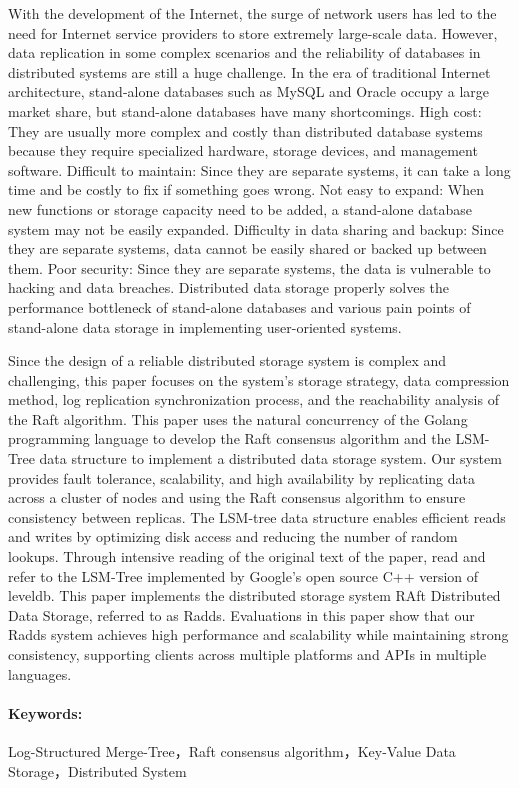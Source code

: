 With the development of the Internet, the surge of network users has led to the need for Internet service providers to store extremely large-scale data. However, data replication in some complex scenarios and the reliability of databases in distributed systems are still a huge challenge.
In the era of traditional Internet architecture, stand-alone databases such as MySQL and Oracle occupy a large market share, but stand-alone databases have many shortcomings.
High cost: They are usually more complex and costly than distributed database systems because they require specialized hardware, storage devices, and management software.
Difficult to maintain: Since they are separate systems, it can take a long time and be costly to fix if something goes wrong.
Not easy to expand: When new functions or storage capacity need to be added, a stand-alone database system may not be easily expanded.
Difficulty in data sharing and backup: Since they are separate systems, data cannot be easily shared or backed up between them.
Poor security: Since they are separate systems, the data is vulnerable to hacking and data breaches.
Distributed data storage properly solves the performance bottleneck of stand-alone databases and various pain points of stand-alone data storage in implementing user-oriented systems.


Since the design of a reliable distributed storage system is complex and challenging, this paper focuses on the system's storage strategy, data compression method, log replication synchronization process, and the reachability analysis of the Raft algorithm.
This paper uses the natural concurrency of the Golang programming language to develop the Raft consensus algorithm and the LSM-Tree data structure to implement a distributed data storage system.
Our system provides fault tolerance, scalability, and high availability by replicating data across a cluster of nodes and using the Raft consensus algorithm to ensure consistency between replicas.
The LSM-tree data structure enables efficient reads and writes by optimizing disk access and reducing the number of random lookups.
Through intensive reading of the original text of the paper, read and refer to the LSM-Tree implemented by Google's open source C++ version of leveldb. This paper implements the distributed storage system RAft Distributed Data Storage, referred to as Radds.
Evaluations in this paper show that our Radds system achieves high performance and scalability while maintaining strong consistency, supporting clients across multiple platforms and APIs in multiple languages.

\paragraph{Keywords: }Log-Structured Merge-Tree，Raft consensus algorithm，Key-Value Data Storage，Distributed System






